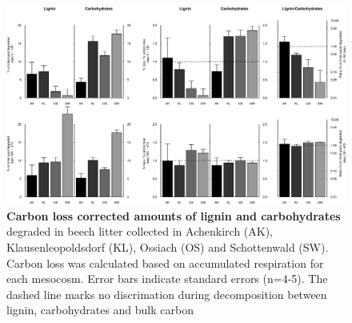 \documentclass[10pt]{article}
\begin{document}
\begin{flushleft}
\newpage
\begin{figure}[h!]
\vspace*{2mm}
\begin{center}
\includegraphics{ligpaper-degrdiff}
\end{center}
\caption{
{\bf Carbon loss corrected amounts of lignin and carbohydrates} degraded in beech litter collected in Achenkirch (AK), Klausenleopoldsdorf (KL), Ossiach (OS) and Schottenwald (SW). Carbon loss was calculated based on accumulated respiration for each mesocosm. Error bars indicate standard errors (n=4-5). The dashed line marks no discrimation during decomposition between lignin, carbohydrates and bulk carbon}
\end{figure}


\end{flushleft}
\end{document}
